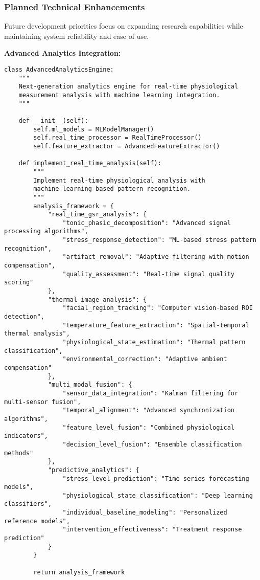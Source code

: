 \documentclass[12pt,a4paper]{article}
\begin{document}
\subsubsection{Planned Technical Enhancements}

Future development priorities focus on expanding research capabilities while maintaining system reliability and ease of
use.

\textbf{Advanced Analytics Integration:}

\begin{verbatim}
class AdvancedAnalyticsEngine:
    """
    Next-generation analytics engine for real-time physiological
    measurement analysis with machine learning integration.
    """
    
    def __init__(self):
        self.ml_models = MLModelManager()
        self.real_time_processor = RealTimeProcessor()
        self.feature_extractor = AdvancedFeatureExtractor()
        
    def implement_real_time_analysis(self):
        """
        Implement real-time physiological analysis with
        machine learning-based pattern recognition.
        """
        analysis_framework = {
            "real_time_gsr_analysis": {
                "tonic_phasic_decomposition": "Advanced signal processing algorithms",
                "stress_response_detection": "ML-based stress pattern recognition",
                "artifact_removal": "Adaptive filtering with motion compensation",
                "quality_assessment": "Real-time signal quality scoring"
            },
            "thermal_image_analysis": {
                "facial_region_tracking": "Computer vision-based ROI detection",
                "temperature_feature_extraction": "Spatial-temporal thermal analysis",
                "physiological_state_estimation": "Thermal pattern classification",
                "environmental_correction": "Adaptive ambient compensation"
            },
            "multi_modal_fusion": {
                "sensor_data_integration": "Kalman filtering for multi-sensor fusion",
                "temporal_alignment": "Advanced synchronization algorithms",
                "feature_level_fusion": "Combined physiological indicators",
                "decision_level_fusion": "Ensemble classification methods"
            },
            "predictive_analytics": {
                "stress_level_prediction": "Time series forecasting models",
                "physiological_state_classification": "Deep learning classifiers",
                "individual_baseline_modeling": "Personalized reference models",
                "intervention_effectiveness": "Treatment response prediction"
            }
        }
        
        return analysis_framework
\end{verbatim}
\end{document}

